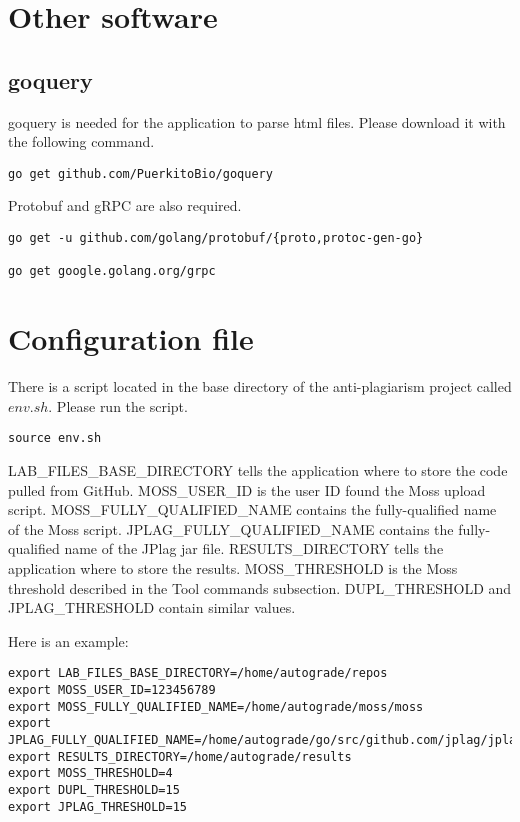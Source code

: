 \documentclass[12pt]{article}
\begin{document}
	\section{Other software}
		\subsection{goquery}
			goquery is needed for the application to parse html files. Please download it with the following command.
			\begin{lstlisting}[breaklines=true]	
go get github.com/PuerkitoBio/goquery
			\end{lstlisting}
			
			Protobuf and gRPC are also required.

			\begin{lstlisting}[breaklines=true]	
go get -u github.com/golang/protobuf/{proto,protoc-gen-go}
			
go get google.golang.org/grpc
			\end{lstlisting}
			 
			
	\section{Configuration file}
		There is a script located in the base directory of the anti-plagiarism project called $env.sh$. Please run the script.
		\begin{lstlisting}[breaklines=true]	
source env.sh
		\end{lstlisting}
		
		LAB\_FILES\_BASE\_DIRECTORY tells the application where to store the code pulled from GitHub. MOSS\_USER\_ID is the user ID found the Moss upload script. MOSS\_FULLY\_QUALIFIED\_NAME contains the fully-qualified name of the Moss script. JPLAG\_FULLY\_QUALIFIED\_NAME contains the fully-qualified name of the JPlag jar file. RESULTS\_DIRECTORY tells the application where to store the results. MOSS\_THRESHOLD is the Moss threshold described in the Tool commands subsection. DUPL\_THRESHOLD and JPLAG\_THRESHOLD contain similar values.
			
		Here is an example:
		\begin{lstlisting}[breaklines=true]	
export LAB_FILES_BASE_DIRECTORY=/home/autograde/repos
export MOSS_USER_ID=123456789
export MOSS_FULLY_QUALIFIED_NAME=/home/autograde/moss/moss
export JPLAG_FULLY_QUALIFIED_NAME=/home/autograde/go/src/github.com/jplag/jplag/jplag/target/jplag.jar
export RESULTS_DIRECTORY=/home/autograde/results
export MOSS_THRESHOLD=4
export DUPL_THRESHOLD=15
export JPLAG_THRESHOLD=15
		\end{lstlisting}		
\end{document}
